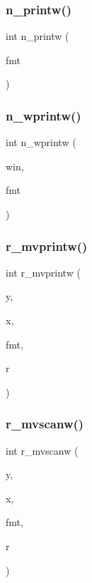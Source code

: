 \subsubsection{\texorpdfstring{n\+\_\+printw()}{n\_printw()}}
{\footnotesize\ttfamily int n\+\_\+printw (\begin{DoxyParamCaption}\item[{const char $\ast$}]{fmt }\end{DoxyParamCaption})}

\mbox{\label{C-macros_8c_aba52f28e4d247225cd79e21121b88655}} 
\subsubsection{\texorpdfstring{n\+\_\+wprintw()}{n\_wprintw()}}
{\footnotesize\ttfamily int n\+\_\+wprintw (\begin{DoxyParamCaption}\item[{W\+I\+N\+D\+OW $\ast$}]{win,  }\item[{const char $\ast$}]{fmt }\end{DoxyParamCaption})}

\mbox{\label{C-macros_8c_ad0708b8c6acaba96f40a85f691012abf}} 
\subsubsection{\texorpdfstring{r\+\_\+mvprintw()}{r\_mvprintw()}}
{\footnotesize\ttfamily int r\+\_\+mvprintw (\begin{DoxyParamCaption}\item[{int}]{y,  }\item[{int}]{x,  }\item[{const char $\ast$}]{fmt,  }\item[{float}]{r }\end{DoxyParamCaption})}

\mbox{\label{C-macros_8c_a63197ac5eb05fa04cb88458e24ba8b98}} 
\subsubsection{\texorpdfstring{r\+\_\+mvscanw()}{r\_mvscanw()}}
{\footnotesize\ttfamily int r\+\_\+mvscanw (\begin{DoxyParamCaption}\item[{int}]{y,  }\item[{int}]{x,  }\item[{char $\ast$}]{fmt,  }\item[{float $\ast$}]{r }\end{DoxyParamCaption})}

